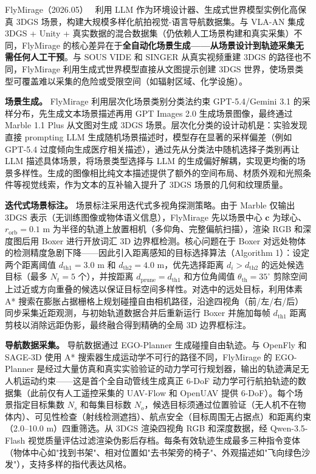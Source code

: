 FlyMirage（2026.05）~\cite{2605_19600} 利用 LLM 作为环境设计器、生成式世界模型实例化高保真 3DGS 场景，构建大规模多样化航拍视觉-语言导航数据集。与 VLA-AN 集成 3DGS + Unity + 真实数据的混合数据集（仍依赖人工场景构建和真实采集）不同，FlyMirage 的核心差异在于\textbf{全自动化场景生成——从场景设计到轨迹采集无需任何人工干预}。与 SOUS VIDE 和 SINGER 从真实视频重建 3DGS 的路径也不同，FlyMirage 利用生成式世界模型直接从文图提示创建 3DGS 世界，使场景类型可覆盖难以采集的危险或受限空间（如辐射区域、化学设施）。

\textbf{场景生成。}
FlyMirage 利用层次化场景类别分类法约束 GPT-5.4/Gemini 3.1 的采样分布，先生成文本场景描述再用 GPT Images 2.0 生成场景图像，最终通过 Marble 1.1 Plus 从文图对生成 3DGS 场景。层次化分类的设计动机是：实验发现直接 prompting LLM 生成随机场景描述时，模型存在显著的采样偏差（例如 GPT-5.4 过度倾向生成医疗相关描述），通过先从分类法中随机选择子类别再让 LLM 描述具体场景，将场景类型选择与 LLM 的生成偏好解耦，实现更均衡的场景多样性。生成的图像相比纯文本描述提供了额外的空间布局、材质外观和光照条件等视觉线索，作为文本的互补输入提升了 3DGS 场景的几何和纹理质量。

\textbf{迭代式场景标注。}
场景标注采用迭代式多视角探测策略。由于 Marble 仅输出 3DGS 表示（无训练图像或物体语义信息），FlyMirage 先以场景中心 $\mathbf{c}$ 为球心、$r_{\mathrm{orb}}=0.1$ m 为半径的轨道上放置相机（多仰角、完整偏航扫描），渲染 RGB 和深度图后用 Boxer 进行开放词汇 3D 边界框检测。核心问题在于 Boxer 对远处物体的检测精度急剧下降——因此引入距离感知的目标选择算法（Algorithm 1）：设定两个距离阈值 $d_{\mathrm{th1}}=3.0$ m 和 $d_{\mathrm{th2}}=4.0$ m，优先选择距离 $d_i > d_{\mathrm{th2}}$ 的远处候选目标（最多 $N_t=5$ 个），并按距离 $d_{\mathrm{prune}}=d_{\mathrm{th1}}$ 和方位角阈值 $\theta_{\mathrm{th}}=35^\circ$ 剪除空间上过近或方向重叠的候选以保证目标空间多样性。对选中的远处目标，利用体素 A* 搜索在膨胀占据栅格上规划碰撞自由相机路径，沿途四视角（前/左/右/后）同步采集近距观测，与初始轨道数据合并后重新运行 Boxer 并施加每帧 $d_{\mathrm{th1}}$ 距离剪枝以消除远距伪影，最终融合得到精确的全局 3D 边界框标注。

\textbf{导航数据采集。}
导航数据通过 EGO-Planner 生成碰撞自由轨迹。与 OpenFly 和 SAGE-3D 使用 A* 搜索器生成运动学不可行的路径不同，FlyMirage 的 EGO-Planner 是经过大量仿真和真实实验验证的动力学可行规划器，输出的轨迹满足无人机运动约束——这是首个全自动管线生成真正 6-DoF 动力学可行航拍轨迹的数据集（此前仅有人工遥控采集的 UAV-Flow 和 OpenUAV 提供 6-DoF）。每个场景指定目标集数 $N_s$ 和每集目标数 $N_o$，候选目标须通过位置验证（无人机不在物体内）、可见性检查（射线检测遮挡）、航点安全（目标周围无占据点）和距离约束（2.0--10.0 m）四重筛选。从 3DGS 渲染四视角 RGB 和深度数据，经 Qwen-3.5-Flash 视觉质量评估过滤渲染伪影后存档。每条有效轨迹生成最多三种指令变体（物体中心如"找到书架"、相对位置如"去书架旁的椅子"、外观描述如"飞向绿色沙发"），支持多样的指代表达风格。

